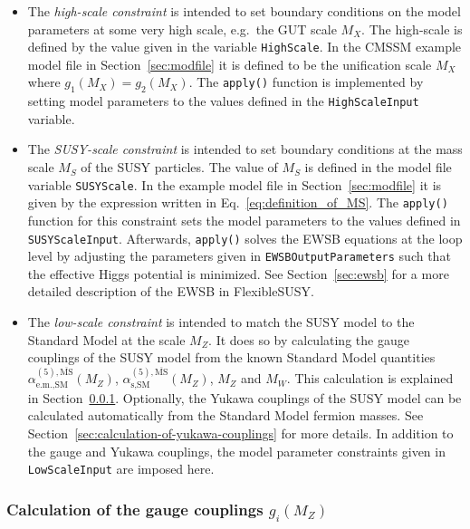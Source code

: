 \documentclass[final,3p,11pt,pdflatex]{elsarticle}
\makeatletter
\newcommand{\fs}{FlexibleSUSY\@\xspace}
\newcommand{\code}[1]{\lstinline|#1|}  %
\newcommand{\textoverline}[1]{$\overline{\mbox{#1}}$}
\newcommand{\MSbar}{\textoverline{MS}\xspace}
\newcommand{\secref}[1]{Section~\ref{#1}}
\makeatother
\begin{document}
\begin{itemize}
\item The \emph{high-scale constraint} is intended to set boundary
  conditions on the model parameters at some very high scale, e.g.\
  the GUT scale $M_X$.  The high-scale is defined by the value given
  in the variable \code{HighScale}.  In the CMSSM example model file
  in \secref{sec:modfile} it is defined to be the unification scale
  $M_X$ where $g_1(M_X) = g_2(M_X)$.  The \code{apply()} function is
  implemented by setting model parameters to the values defined in the
  \code{HighScaleInput} variable.

\item The \emph{SUSY-scale constraint} is intended to set boundary
  conditions at the mass scale $M_S$ of the SUSY particles.  The value
  of $M_S$ is defined in the model file variable \code{SUSYScale}.  In
  the example model file in \secref{sec:modfile} it is given by the
  expression written in Eq.~\eqref{eq:definition_of_MS}.  The
  \code{apply()} function for this constraint sets the model
  parameters to the values defined in \code{SUSYScaleInput}.
  Afterwards, \code{apply()} solves the EWSB equations at the loop
  level by adjusting the parameters given in
  \code{EWSBOutputParameters} such that the effective Higgs potential
  is minimized.  See \secref{sec:ewsb} for a more detailed description
  of the EWSB in \fs.

\item The \emph{low-scale constraint} is intended to match the SUSY
  model to the Standard Model at the scale $M_Z$.  It does so by
  calculating the gauge couplings of the SUSY model from the known
  Standard Model quantities
  $\alpha_{\text{e.m.},\text{SM}}^{(5),\text{\MSbar}}(M_Z)$,
  $\alpha_{\text{s},\text{SM}}^{(5),\text{\MSbar}}(M_Z)$, $M_Z$ and
  $M_W$.  This calculation is explained in
  \secref{sec:calculation-of-gauge-couplings}.  Optionally, the Yukawa
  couplings of the SUSY model can be calculated automatically from the
  Standard Model fermion masses.  See
  \secref{sec:calculation-of-yukawa-couplings} for more details.  In
  addition to the gauge and Yukawa couplings, the model parameter
  constraints given in \code{LowScaleInput} are imposed here.
\end{itemize}

\subsubsection{Calculation of the gauge couplings $g_i(M_Z)$}
\label{sec:calculation-of-gauge-couplings}
\end{document}
